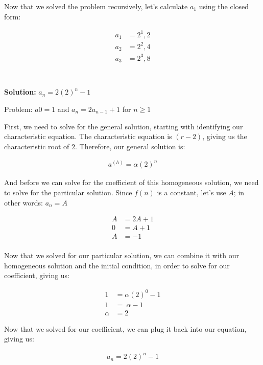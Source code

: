 \documentclass{article}
\begin{document}
Now that we solved the problem recursively, let's calculate $a_1$ using the closed form:

\begin{align*}
a_1 &= 2^1, 2\\
a_2 &= 2^2, 4 \\
a_3 &= 2^3, 8 \\
\end{align*}

\section{}
\textbf{Solution: } $a_n = 2(2)^n - 1$

Problem: $a0=1$ and $a_n = 2a_{n-1} +1$ for $n \ge 1$

First, we need to solve for the general solution, starting with identifying our characteristic equation. The characteristic equation is $(r-2)$, giving us the characteristic root of $2$. Therefore, our general solution is:

\begin{align*}
    a^{(h)} = \alpha(2)^n
\end{align*}

And before we can solve for the coefficient of this homogeneous solution, we need to solve for the particular solution. Since $f(n)$ is a constant, let's use $A$; in other words: $a_n = A$

\begin{align*}
    A &= 2A + 1 \\
    0 &= A + 1 \\
    A &= -1 \\
\end{align*}

Now that we solved for our particular solution, we can combine it with our homogeneous solution and the initial condition, in order to solve for our coefficient, giving us:

\begin{align*}
    1 &= \alpha(2)^0 - 1 \\
    1 &=\ \alpha - 1 \\
    \alpha &= 2
\end{align*}

Now that we solved for our coefficient, we can plug it back into our equation, giving us:

\begin{align*}
    a_n = 2(2)^n - 1 \\
\end{align*}
\end{document}
